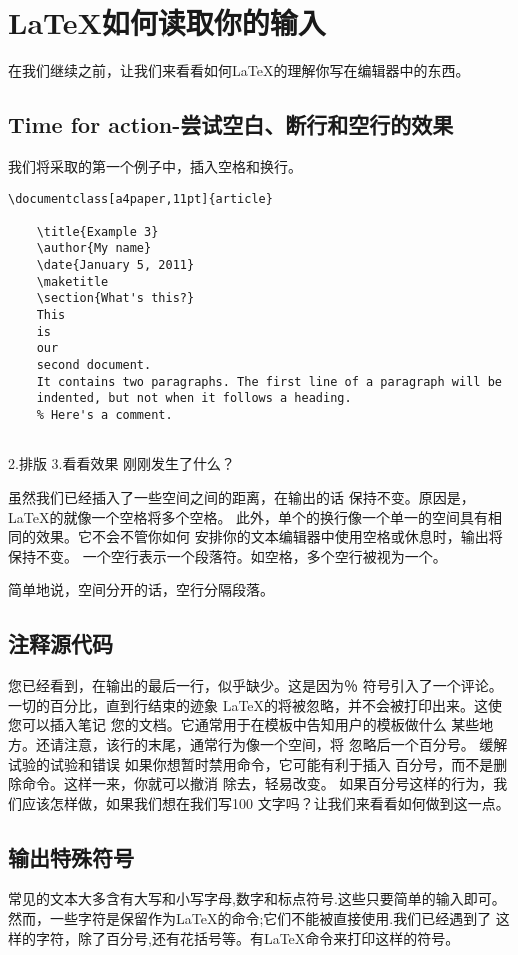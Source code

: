 \section{LaTeX如何读取你的输入}
在我们继续之前，让我们来看看如何LaTeX的理解你写在编辑器中的东西。
	\subsection{Time for action-尝试空白、断行和空行的效果}
	我们将采取的第一个例子中，插入空格和换行。
	\begin{lstlisting}[language={[LaTeX]TeX}]
	\documentclass[a4paper,11pt]{article}
	
	\title{Example 3}
	\author{My name}
	\date{January 5, 2011}
	\maketitle
	\section{What's this?}
	This
	is
	our
	second document.
	It contains two paragraphs. The first line of a paragraph will be
	indented, but not when it follows a heading.
	% Here's a comment.
	
	\end{lstlisting}
	2.排版
	3.看看效果
	刚刚发生了什么？

	虽然我们已经插入了一些空间之间的距离，在输出的话
	保持不变。原因是，LaTeX的就像一个空格将多个空格。
	此外，单个的换行像一个单一的空间具有相同的效果。它不会不管你如何
	安排你的文本编辑器中使用空格或休息时，输出将保持不变。
	一个空行表示一个段落符。如空格，多个空行被视为一个。

	简单地说，空间分开的话，空行分隔段落。
	\subsection{注释源代码}
	您已经看到，在输出的最后一行，似乎缺少。这是因为％
	符号引入了一个评论。一切的百分比，直到行结束的迹象
	LaTeX的将被忽略，并不会被打印出来。这使您可以插入笔记
	您的文档。它通常用于在模板中告知用户的模板做什么
	某些地方。还请注意，该行的末尾，通常行为像一个空间，将
	忽略后一个百分号。
	缓解试验的试验和错误
	如果你想暂时禁用命令，它可能有利于插入
	百分号，而不是删除命令。这样一来，你就可以撤消
	除去\％，轻易改变。
	如果百分号这样的行为，我们应该怎样做，如果我们想在我们写100\％
	文字吗？让我们来看看如何做到这一点。
	\subsection{输出特殊符号}
常见的文本大多含有大写和小写字母,数字和标点符号.这些只要简单的输入即可。
然而，一些字符是保留作为LaTeX的命令;它们不能被直接使用.我们已经遇到了
这样的字符，除了百分号,还有花括号等。有LaTeX命令来打印这样的符号。
